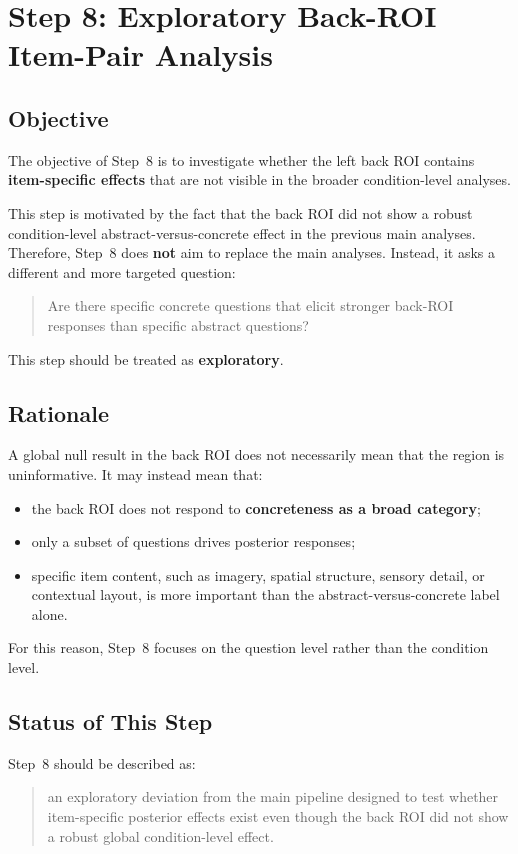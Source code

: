 \documentclass[11pt]{article}
\begin{document}
\sloppy
\section{Step 8: Exploratory Back-ROI Item-Pair Analysis}
\label{sec:step8_back_roi_items}

\subsection{Objective}
The objective of Step~8 is to investigate whether the left back ROI contains
\textbf{item-specific effects} that are not visible in the broader condition-level analyses.

This step is motivated by the fact that the back ROI did not show a robust
condition-level abstract-versus-concrete effect in the previous main analyses.
Therefore, Step~8 does \textbf{not} aim to replace the main analyses.
Instead, it asks a different and more targeted question:
\begin{quote}
Are there specific concrete questions that elicit stronger back-ROI responses than specific abstract questions?
\end{quote}

This step should be treated as \textbf{exploratory}.

\subsection{Rationale}
A global null result in the back ROI does not necessarily mean that the region is uninformative.
It may instead mean that:
\begin{itemize}
    \item the back ROI does not respond to \textbf{concreteness as a broad category};
    \item only a subset of questions drives posterior responses;
    \item specific item content, such as imagery, spatial structure, sensory detail, or contextual layout,
    is more important than the abstract-versus-concrete label alone.
\end{itemize}

For this reason, Step~8 focuses on the question level rather than the condition level.

\subsection{Status of This Step}
Step~8 should be described as:
\begin{quote}
an exploratory deviation from the main pipeline designed to test whether item-specific posterior effects
exist even though the back ROI did not show a robust global condition-level effect.
\end{quote}
\end{document}
